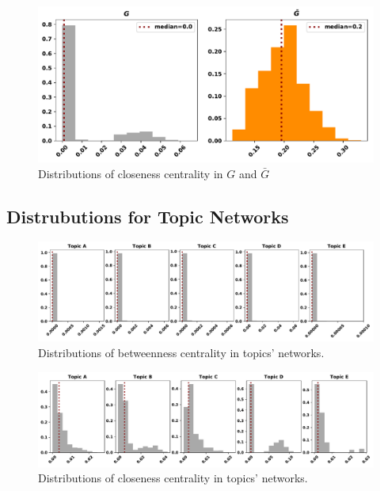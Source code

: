 \documentclass{article}
\theoremstyle{definition}
\begin{document}
\begin{figure}[!hbtp]
    \centering
    \includegraphics[width=.8\textwidth]{./assets/images/pd_closeness_centralities.pdf}
    \caption{Distributions of closeness centrality in \(G\) and \(\bar{G}\)}
    \label{fig:cc_distributions}
\end{figure}

\subsection{Distrubutions for Topic Networks}\label{appendix:distributions}

\begin{figure}[!hbtp]
    \centering
    \includegraphics[width=\textwidth]{./assets/images/topics_betweeness_distributions.pdf}
    \caption{Distributions of betweenness centrality in topics' networks.}
    \label{fig:bc_distributions_topics}
\end{figure}

\begin{figure}[!hbtp]
    \centering
    \includegraphics[width=\textwidth]{./assets/images/topics_closeness_distributions.pdf}
    \caption{Distributions of closeness centrality in topics' networks.}
    \label{fig:cc_distributions_topics}
\end{figure}
\end{document}
